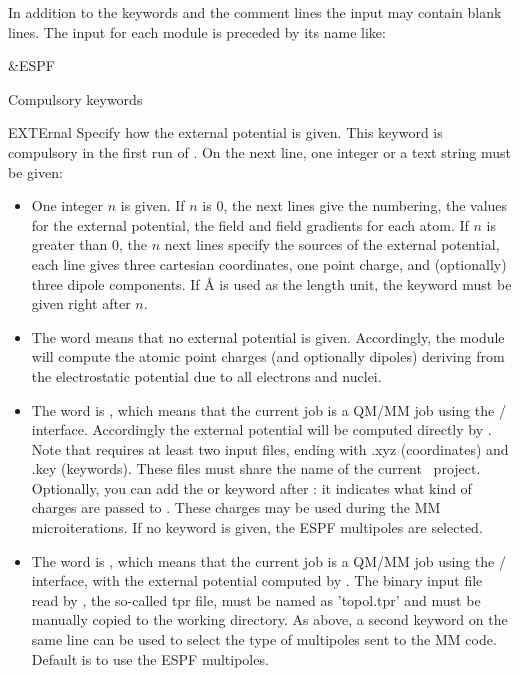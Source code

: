 In addition to the keywords and the comment lines the input may contain blank lines. The input for each module is preceded by its name like:
\begin{inputlisting}
 &ESPF
\end{inputlisting}

Compulsory keywords
\begin{keywordlist}
\item[EXTErnal]
Specify how the external potential is given. This keyword is compulsory in the first run of . On the next line, one integer or a text string must be given:
\begin{itemize}
\item One integer $n$ is given. If $n$ is 0, the next lines give the numbering, the values for the external potential, the field and field gradients for each atom. If $n$ is greater than 0, the $n$ next lines specify the sources of the external potential, each line gives three cartesian coordinates, one point charge, and (optionally) three dipole components. If {\AA} is used as the length unit, the  keyword must be given right after $n$.
\item The  word means that no external potential is given. Accordingly, the  module will compute the atomic point charges (and optionally dipoles) deriving from the electrostatic potential due to all electrons and nuclei.
\item The word is , which means that the current job is a QM/MM job using the \molcas/ interface. Accordingly the external potential will be computed directly by . Note that  requires at least two input files, ending with .xyz (coordinates) and .key (keywords). These files must share the name of the current \molcas\ project. Optionally, you can add the  or  keyword after : it indicates what kind of charges are passed to . These charges may be used during the MM microiterations. If no keyword is given, the ESPF multipoles are selected.
\item The word is , which means that the current job is a QM/MM job using the \molcas/ interface, with the external potential computed by . The binary input file read by , the so-called tpr file, must be named as 'topol.tpr' and must be manually copied to the working directory. As above, a second keyword on the same line can be used to select the type of multipoles sent to the MM code. Default is to use the ESPF multipoles.

\end{itemize}
\end{keywordlist}
